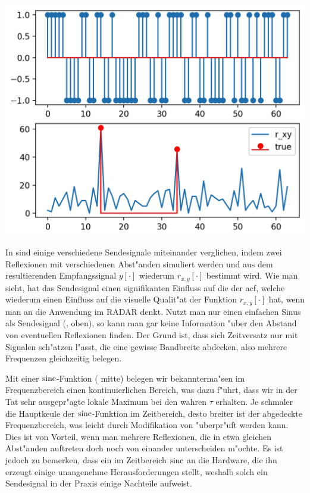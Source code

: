 \begin{listing}[ht]
\begin{minipage}{0.48\textwidth}
        \includegraphics[width=\textwidth]{code/radar_1_3.png}
    \end{minipage}
    \label{py:radar1}
\end{listing}

In  sind einige verschiedene Sendesignale miteinander verglichen, indem zwei Reflexionen mit verschiedenen Abst"anden simuliert werden und aus dem resultierenden Empfangssignal $y[\cdot]$ wiederum $r_{x,y}[\cdot]$ bestimmt wird.
Wie man sieht, hat das Sendesignal einen signifikanten Einfluss auf die  der \gls{acf}, welche wiederum einen Einfluss auf die visuelle Qualit"at der Funktion $r_{x,y}[\cdot]$ hat, wenn man an die Anwendung im RADAR denkt.
Nutzt man nur einen einfachen Sinus als Sendesignal (, oben), so kann man gar keine Information "uber den Abstand von eventuellen Reflexionen finden. 
Der Grund ist, dass sich Zeitversatz nur mit Signalen sch"atzen l"asst, die eine gewisse Bandbreite abdecken, also mehrere Frequenzen gleichzeitig belegen.

Mit einer $\operatorname*{sinc}$-Funktion ( mitte) belegen wir bekannterma"sen im Frequenzbereich einen kontinuierlichen Bereich, was dazu f"uhrt, dass wir in der Tat sehr ausgepr"agte lokale Maximum bei den wahren $\tau$ erhalten.
Je schmaler die Hauptkeule der $\operatorname*{sinc}$-Funktion im Zeitbereich, desto breiter ist der abgedeckte Frequenzbereich, was leicht durch Modifikation von  "uberpr"uft werden kann.
Dies ist von Vorteil, wenn man mehrere Reflexionen, die in etwa gleichen Abst"anden auftreten doch noch von einander unterscheiden m"ochte.
Es ist jedoch zu bemerken, dass ein im Zeitbereich  $\operatorname*{sinc}$ an die Hardware, die ihn erzeugt einige unangenehme Herausforderungen stellt, weshalb solch ein Sendesignal in der Praxis einige Nachteile aufweist.

